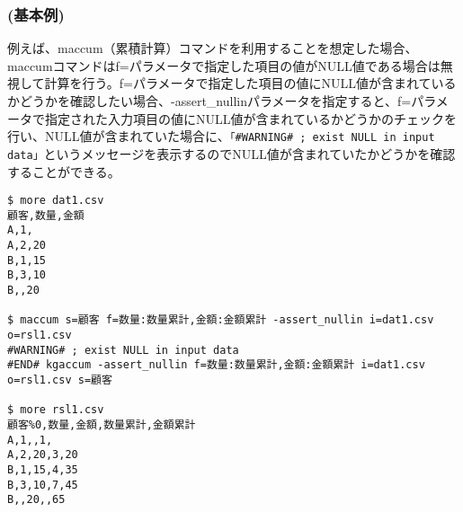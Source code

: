 \subsubsection*{(基本例) }
例えば、maccum（累積計算）コマンドを利用することを想定した場合、maccumコマンドはf=パラメータで指定した項目の値がNULL値である場合は無視して計算を行う。f=パラメータで指定した項目の値にNULL値が含まれているかどうかを確認したい場合、-assert\_nullinパラメータを指定すると、f=パラメータで指定された入力項目の値にNULL値が含まれているかどうかのチェックを行い、NULL値が含まれていた場合に、\verb|「#WARNING# ; exist NULL in input data」|というメッセージを表示するのでNULL値が含まれていたかどうかを確認することができる。

\begin{Verbatim}[baselinestretch=0.7,frame=single]
$ more dat1.csv
顧客,数量,金額
A,1,
A,2,20
B,1,15
B,3,10
B,,20

$ maccum s=顧客 f=数量:数量累計,金額:金額累計 -assert_nullin i=dat1.csv o=rsl1.csv
#WARNING# ; exist NULL in input data
#END# kgaccum -assert_nullin f=数量:数量累計,金額:金額累計 i=dat1.csv o=rsl1.csv s=顧客

$ more rsl1.csv
顧客%0,数量,金額,数量累計,金額累計
A,1,,1,
A,2,20,3,20
B,1,15,4,35
B,3,10,7,45
B,,20,,65
\end{Verbatim}
